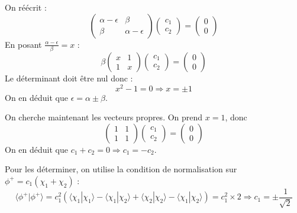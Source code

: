 \documentclass[french]{yLectureNote}
\begin{document}
On réécrit  :
\[\begin{pmatrix}\alpha-\epsilon&\beta\\ \beta &\alpha-\epsilon \end{pmatrix} \begin{pmatrix}c_1\\c_2 \end{pmatrix} = \begin{pmatrix}0\\0 \end{pmatrix}\]
En posant \(\frac{\alpha-\epsilon}{\beta} = x\) :
\[\beta \begin{pmatrix}x&1\\ 1 &x \end{pmatrix} \begin{pmatrix}c_1\\c_2 \end{pmatrix} = \begin{pmatrix}0\\0 \end{pmatrix}\]Le déterminant doit \^etre nul donc :
\[x^2-1 = 0\Rightarrow x = \pm 1\] On en déduit que \(\epsilon = \alpha \pm \beta\).

On cherche maintenant les vecteurs propres. On prend \(x = 1\), donc \[\begin{pmatrix}1&1\\1&1\end{pmatrix}\begin{pmatrix}c_1\\c_2 \end{pmatrix} = \begin{pmatrix}0\\0 \end{pmatrix}\]
On en déduit que \(c_1+c_2=0\Rightarrow c_1=-c_2\).

Pour les déterminer, on utilise la condition de normalisation sur \(\phi^+ = c_1(\chi_1+\chi_2)\) : \[\langle \phi^+|\phi^+\rangle = c_1^2(\langle \chi_1|\chi_1\rangle-\langle \chi_1|\chi_2\rangle+\langle \chi_2|\chi_2\rangle-\langle \chi_1|\chi_2\rangle) = c_1^2\times 2 \Rightarrow c_1 = \pm \frac{1}{\sqrt{2}}\]
\end{document}
